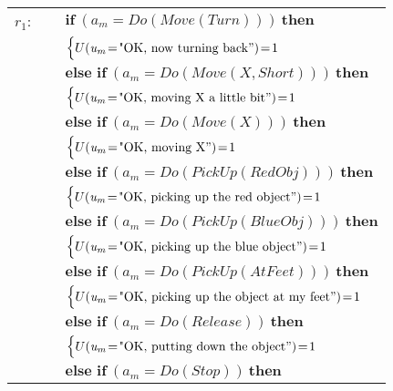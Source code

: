 \begin{footnotesize}
\begin{longtable}{p{2cm}l}
$r_{1}$: \ \ & $ \textbf{if} \ (\mathit{a_m}\!=\!\mathit{Do(Move(Turn))}) \ \textbf{then} $ \\
 & \;\;\;\;\; $ \begin{cases}U(\mathit{u_m}\!=\!\text{"OK, now turning back}")\!=\!1 \end{cases}$\\[3mm] & $ \textbf{else if} \ (\mathit{a_m}\!=\!\mathit{Do(Move({X},Short))}) \ \textbf{then}$ \\
& \;\;\;\;\; $ \begin{cases}U(\mathit{u_m}\!=\!\text{"OK, moving {X} a little bit}")\!=\!1 \end{cases}$\\[3mm] & $ \textbf{else if} \ (\mathit{a_m}\!=\!\mathit{Do(Move({X}))}) \ \textbf{then}$ \\
& \;\;\;\;\; $ \begin{cases}U(\mathit{u_m}\!=\!\text{"OK, moving {X}}")\!=\!1 \end{cases}$\\[3mm] & $ \textbf{else if} \ (\mathit{a_m}\!=\!\mathit{Do(PickUp(RedObj))}) \ \textbf{then}$ \\
& \;\;\;\;\; $ \begin{cases}U(\mathit{u_m}\!=\!\text{"OK, picking up the red object}")\!=\!1 \end{cases}$\\[3mm] & $ \textbf{else if} \ (\mathit{a_m}\!=\!\mathit{Do(PickUp(BlueObj))}) \ \textbf{then}$ \\
& \;\;\;\;\; $ \begin{cases}U(\mathit{u_m}\!=\!\text{"OK, picking up the blue object}")\!=\!1 \end{cases}$\\[3mm] & $ \textbf{else if} \ (\mathit{a_m}\!=\!\mathit{Do(PickUp(AtFeet))}) \ \textbf{then}$ \\
& \;\;\;\;\; $ \begin{cases}U(\mathit{u_m}\!=\!\text{"OK, picking up the object at my feet}")\!=\!1 \end{cases}$\\[3mm] & $ \textbf{else if} \ (\mathit{a_m}\!=\!\mathit{Do(Release)}) \ \textbf{then}$ \\
& \;\;\;\;\; $ \begin{cases}U(\mathit{u_m}\!=\!\text{"OK, putting down the object}")\!=\!1 \end{cases}$\\[3mm] & $ \textbf{else if} \ (\mathit{a_m}\!=\!\mathit{Do(Stop)}) \ \textbf{then}$ \\

\end{longtable}
\end{footnotesize}
